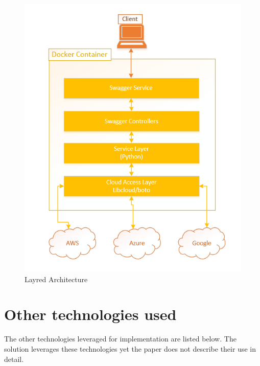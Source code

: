 \begin{figure}[!ht]
  \centering
  \includegraphics[width=\columnwidth]{images/layred-arch.PNG}
  \caption{Layred Architecture}\label{F:layerd-arch}
\end{figure}

\section{Other technologies used}
The other technologies leveraged for implementation are listed below. The
solution leverages these technologies yet the paper does not describe their
use in detail.

